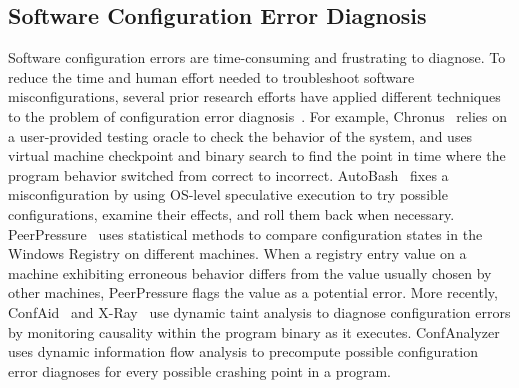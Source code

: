 

\subsection{Software Configuration Error Diagnosis}

Software configuration errors are time-consuming
and frustrating to diagnose. To reduce the time and human
effort needed to troubleshoot software misconfigurations,
several prior research efforts have applied different techniques
to the problem of configuration error diagnosis~\cite{Attariyan:2008:UCD, 
Whitaker:2004:CDS, Wang:2004:AMT, rangefix,
Attariyan:2010:ACT, Rabkin:2011:PPC, keller:conferr}.
For example, Chronus~\cite{Whitaker:2004:CDS} relies
on a user-provided testing oracle to check the behavior
of the system, and uses
virtual machine checkpoint and binary search to find the
point in time where the program behavior
switched from correct to incorrect. AutoBash~\cite{Su:2007:AIC}
fixes a misconfiguration by using
OS-level speculative execution to try possible
configurations, examine their effects, and roll them back when necessary.
PeerPressure~\cite{Wang:2004:AMT} 
uses statistical methods to compare
configuration states in the Windows Registry on different machines.
When a registry entry value on a machine exhibiting erroneous behavior differs
from the value usually chosen by other machines, PeerPressure
flags the value as a potential error. More recently, 
ConfAid~\cite{Attariyan:2010:ACT} and X-Ray~\cite{xray}
use dynamic taint analysis to diagnose configuration errors
by monitoring causality within the program binary as it executes.
ConfAnalyzer~\cite{Rabkin:2011:PPC} uses dynamic information flow analysis to precompute
possible configuration error diagnoses for every possible crashing point
in a program. 


